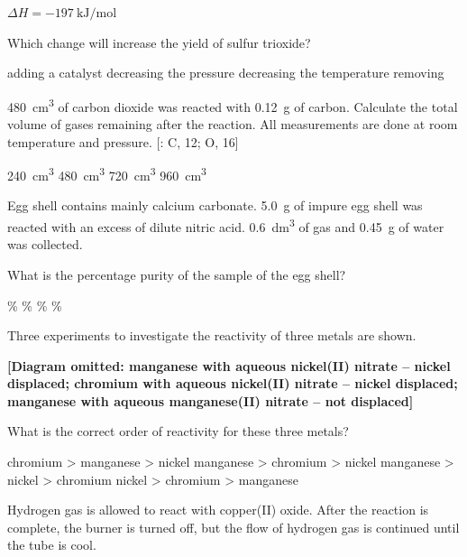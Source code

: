 \documentclass[11pt]{exam}
\begin{document}
\begin{questions}
 \qquad $\Delta H = \qty{-197}{\kJ\per\mol}$

Which change will increase the yield of sulfur trioxide?

\begin{choices}
\choice adding a catalyst
\choice decreasing the pressure
\choice decreasing the temperature
\choice removing 
\end{choices}

\newpage

\question \qty{480}{\cm\cubed} of carbon dioxide was reacted with \qty{0.12}{\g} of carbon. Calculate the total volume of gases remaining after the reaction. All measurements are done at room temperature and pressure. [: C, 12; O, 16]


\begin{choices}
\choice \qty{240}{\cm\cubed}
\choice \qty{480}{\cm\cubed}
\choice \qty{720}{\cm\cubed}
\choice \qty{960}{\cm\cubed}
\end{choices}

\question Egg shell contains mainly calcium carbonate. \qty{5.0}{\g} of impure egg shell was reacted with an excess of dilute nitric acid. \qty{0.6}{\dm\cubed} of gas and \qty{0.45}{\g} of water was collected.

What is the percentage purity of the sample of the egg shell?

\begin{choices}
\%
\%
\%
\%
\end{choices}

\question Three experiments to investigate the reactivity of three metals are shown.

\textbf{[Diagram omitted: manganese with aqueous nickel(II) nitrate -- nickel displaced; chromium with aqueous nickel(II) nitrate -- nickel displaced; manganese with aqueous manganese(II) nitrate -- not displaced]}

What is the correct order of reactivity for these three metals?

\begin{choices}
\choice chromium > manganese > nickel
\choice manganese > chromium > nickel
\choice manganese > nickel > chromium
\choice nickel > chromium > manganese
\end{choices}

\question Hydrogen gas is allowed to react with copper(II) oxide. After the reaction is complete, the burner is turned off, but the flow of hydrogen gas is continued until the tube is cool.


\end{questions}
\end{document}
